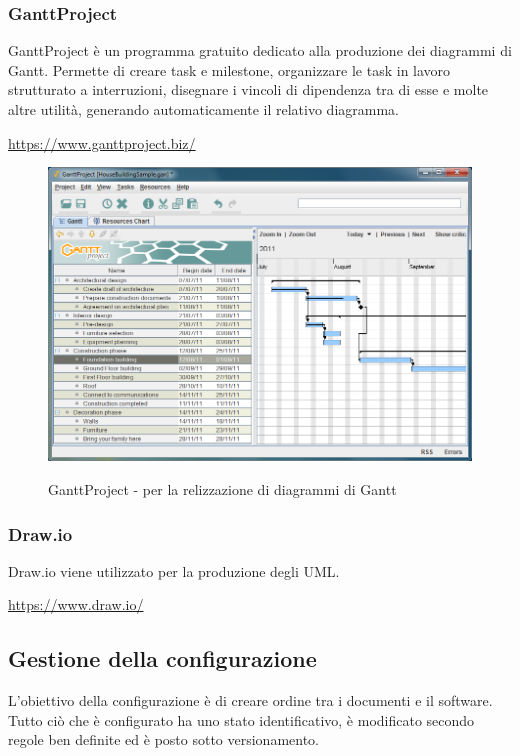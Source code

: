 \subsubsection{GanttProject}
GanttProject è un programma gratuito dedicato alla produzione dei diagrammi di Gantt\glo. Permette di creare task e milestone\glo, organizzare le task in lavoro strutturato a interruzioni, disegnare
i vincoli di dipendenza tra di esse e molte altre utilità, generando automaticamente il relativo diagramma. \\
\centerline{\url{https://www.ganttproject.biz/}}
\begin{figure}[H]
	\includegraphics[width=0.99\linewidth]{../Norme_di_progetto/img/gantt.png}\\
			\caption{GanttProject - per la relizzazione di diagrammi di Gantt}
\end{figure}

\subsubsection{Draw.io}
Draw.io viene utilizzato per la produzione degli UML.\\
\centerline{\url{https://www.draw.io/}} 

\subsection{Gestione della configurazione}
L'obiettivo della configurazione è di creare ordine tra i documenti e il software. Tutto ciò che è configurato ha uno stato identificativo, è modificato secondo regole ben definite ed è posto sotto versionamento\glo.

